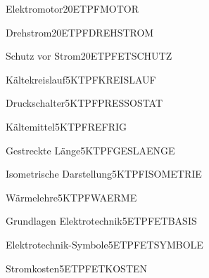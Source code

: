 \documentclass[bsz-mkk-exam,ka]{teacher}
\begin{document}
\begin{examaufgabe}[T]{Elektromotor}{20}{ET}{PF}{MOTOR}
\end{examaufgabe}

\begin{examaufgabe}[T]{Drehstrom}{20}{ET}{PF}{DREHSTROM}
\end{examaufgabe}

\begin{examaufgabe}[T]{Schutz vor Strom}{20}{ET}{PF}{ETSCHUTZ}
\end{examaufgabe}

\begin{examaufgabe}[T]{Kältekreislauf}{5}{KT}{PF}{KREISLAUF}
\end{examaufgabe}

\begin{examaufgabe}[T]{Druckschalter}{5}{KT}{PF}{PRESSOSTAT}
\end{examaufgabe}

\begin{examaufgabe}[T]{Kältemittel}{5}{KT}{PF}{REFRIG}
\end{examaufgabe}

\begin{examaufgabe}[T]{Gestreckte Länge}{5}{KT}{PF}{GESLAENGE}
\end{examaufgabe}

\begin{examaufgabe}[T]{Isometrische Darstellung}{5}{KT}{PF}{ISOMETRIE}
\end{examaufgabe}

\begin{examaufgabe}[T]{Wärmelehre}{5}{KT}{PF}{WAERME}
\end{examaufgabe}

\begin{examaufgabe}[T]{Grundlagen Elektrotechnik}{5}{ET}{PF}{ETBASIS}
\end{examaufgabe}

\begin{examaufgabe}[T]{Elektrotechnik-Symbole}{5}{ET}{PF}{ETSYMBOLE}
\end{examaufgabe}

\begin{examaufgabe}[T]{Stromkosten}{5}{ET}{PF}{ETKOSTEN}
\end{examaufgabe}
\end{document}
